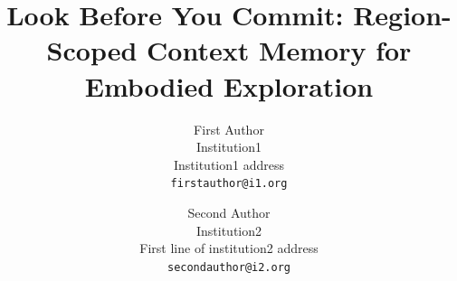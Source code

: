 \documentclass[10pt,twocolumn,letterpaper]{article}
\title{Look Before You Commit: Region-Scoped Context Memory for Embodied Exploration}
\author{First Author\\
Institution1\\
Institution1 address\\
{\tt\small firstauthor@i1.org}
\and
Second Author\\
Institution2\\
First line of institution2 address\\
{\tt\small secondauthor@i2.org}
}
\begin{document}
\maketitle
    



{
    \small
    
    
}

% 
\end{document}
